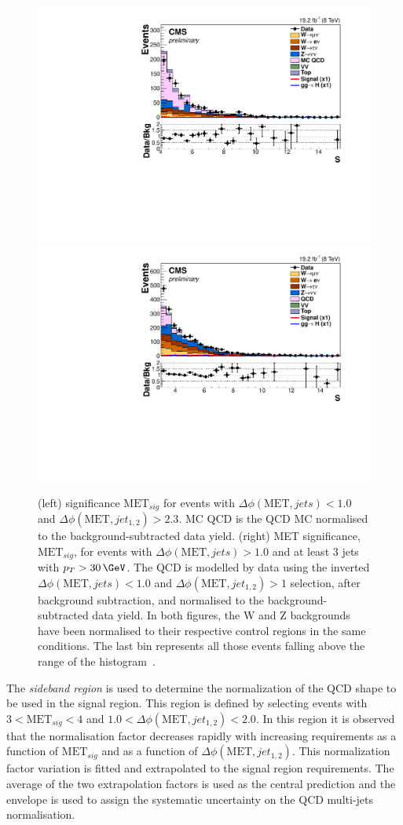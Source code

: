 \begin{figure}[!htb]
\centering
\includegraphics[width=.45\textwidth]{Chapter07/Images/output_invqcd_qcd_metnomu_significance.pdf}
\includegraphics[width=.45\textwidth]{Chapter07/Images/output_invqcd_3j_nunu_metnomu_significance.pdf}
\caption[\MET significance $\text{MET}_{sig}$ for events with $\Delta\phi(\text{MET},jets)<1.0$ and $\Delta\phi(\text{MET},jet_{1,2})>2.3$. MET significance, $\text{MET}_{sig}$, for events with $\Delta\phi(\text{MET},jets)>1.0$ and at least 3 jets with $p_T>30\,\GeV$.]
{(left) \MET significance $\text{MET}_{sig}$ for events with $\Delta\phi(\text{MET},jets)<1.0$ and $\Delta\phi(\text{MET},jet_{1,2})>2.3$. MC QCD is the \gls{QCD} \gls{MC} normalised to the background-subtracted data yield. (right) \gls{MET} significance, $\text{MET}_{sig}$, for events with $\Delta\phi(\text{MET},jets)>1.0$ and at least 3 jets with $p_T>30\,\GeV$. The \gls{QCD} is modelled by data using the inverted $\Delta\phi(\text{MET},jets)<1.0$ and $\Delta\phi(\text{MET},jet_{1,2})>1$ selection, after background subtraction, and normalised to the background-subtracted data yield. In both figures, the W and Z backgrounds have been normalised to their respective control regions in the same conditions. The last bin represents all those events falling above the range of the histogram~\cite{ARTICLE:CMSVBFHiggsInvisibleParkedAnalysisPAS}.}
\label{FIGURE:ParkedDataAnalysis_QCDBackground_Plots}
\end{figure}

The \textit{sideband region} is used to determine the normalization of the \gls{QCD} shape to be used in the signal region. This region is defined by selecting events with $3<\text{MET}_{sig}<4$ and $1.0<\Delta\phi(\text{MET},jet_{1,2})<2.0$. In this region it is observed that the normalisation factor decreases rapidly with increasing requirements as a function of $\text{MET}_{sig}$ and as a function of $\Delta\phi(\text{MET},jet_{1,2})$. This normalization factor variation is fitted and extrapolated to the signal region requirements. The average of the two extrapolation factors is used as the central prediction and the envelope is used to assign the systematic uncertainty on the \gls{QCD} multi-jets normalisation.

